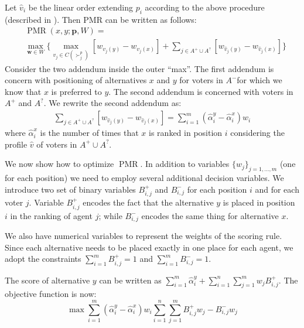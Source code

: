 \documentclass[12pt]{article}
\newcommand{\pprofile}{\textbf{p}}%
\newcommand{\w}{\textbf{w}}%
\DeclareMathOperator{\PMR}{PMR}
\begin{document}
\medskip
Let $\hat{v}_i$ be the linear order extending $p_i$ according to the above procedure (described in \cite{Lu2011}).
Then PMR can be written as follows:
\begin{align*}
 &\PMR(x,y; \pprofile, W) =\\ 
 &\max_{\w \in W} \Big \{ \max_{v_j \in C(\succ_j^p)} [w_{v_j(y)} \!-\! w_{v_j(x)}]  \!+\!	 \sum_{j \in A^+ \cup  A^?} [w_{\hat{v}_j(y)} \!-\! w_{\hat{v}_j(x)}] \Big \} 
 \end{align*}
Consider the two addendum inside the outer ``max''. 
The first addendum is concern with positioning of alternatives $x$ and $y$ for voters in $A^{-}$for which we know that $x$ is preferred to $y$.
The second addendum is concerned with voters in $A^{+}$ and $A^{?}$.
We rewrite the second addendum as:
\begin{align*}
\sum_{j \in A^+ \cup  A^?} [w_{\hat{v}_j(y)} \!-\! w_{\hat{v}_j(x)}] 
= \sum_{i = 1}^{m} (\hat{\alpha}_{i}^{y} - \hat{\alpha}_{i}^{x}) w_{i}
\end{align*}
where $\hat{\alpha}_{i}^{x}$ is the number of times that $x$ is ranked  in position $i$  considering the profile $\hat{v}$ of voters in $A^+ \cup  A^?$.

We now show how to optimize $\PMR$.
In addition to variables $\{ w_{j} \}_{j=1,\ldots,m}$ (one for each position) we need to employ several additional decision variables.
We introduce two set of binary variables $B^{+}_{i,j}$ and $B^{-}_{i,j}$  for each position $i$ and for each voter $j$.
Variable $B_{i,j}^{+}$ encodes the fact that the alternative $y$ is placed in position $i$ in the ranking of agent $j$; while  $B_{i,j}^{-}$ encodes the same thing for alternative $x$.

We also have numerical variables to represent the weights of the scoring rule.
Since each alternative needs to be placed exactly in one place for each agent, we adopt the constraints
$\sum_{i=1}^{m} B_{i,j}^{+} = 1$ and $\sum_{i=1}^{m} B_{i,j}^{-} = 1$.

The score of alternative $y$ can be written as $\sum_{i = 1}^{m} \hat{\alpha}_{i}^{y} + \sum_{i=1}^{n} \sum_{j=1}^{m} w_{j} B_{i,j}^{+}$.
The objective function is now:
 \[ \max \sum_{i = 1}^{m} (\hat{\alpha}_{i}^{y} - \hat{\alpha}_{i}^{x}) w_{i}  \sum_{i=1}^{n} \sum_{j=1}^{m} B_{i,j}^{+} w_j- B_{i,j}^{-}  w_j \]
\end{document}

